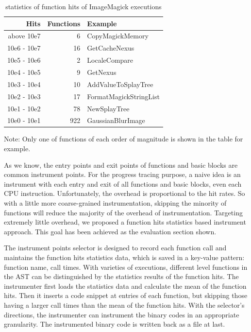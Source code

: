  \begin{table}[h]
\caption{statistics of function hits of ImageMagick executions}
\label{table:inst-stats}
\begin{center}
\begin{tabular}{r|r|l}
\hline
Hits & Functions & Example \\
\hline
above  10e7 & 6 & CopyMagickMemory \\
10e6 - 10e7 & 16 & GetCacheNexus \\
10e5 - 10e6 & 2 & LocaleCompare \\
10e4 - 10e5 & 9 & GetNexus \\
10e3 - 10e4 & 10 & AddValueToSplayTree \\
10e2 - 10e3 & 17 & FormatMagickStringList \\
10e1 - 10e2 & 78 & NewSplayTree \\
10e0 - 10e1 & 922 & GaussianBlurImage \\
\hline
\end{tabular}
\end{center}
Note: Only one of functions of each order of magnitude is shown in the table for example.
\end{table}

As we know, the entry points and exit points of functions and basic blocks are common instrument points. For the progress tracing purpose, a naive idea is an instrument with each entry and exit of all functions and basic blocks, even each CPU instruction. Unfortunately, the overhead is proportional to the hit rates. So with a little more coarse-grained instrumentation, skipping the minority of functions will reduce the majority of the overhead of instrumentation. Targeting extremely little overhead, we proposed a function hits statistics based instrument approach. This goal has been achieved as the evaluation section shown.

The instrument points selector is designed to record each function call and maintains the function hits statistics data, which is saved in a key-value pattern: function name, call times. With varieties of executions, different level functions in the AST can be distinguished by the statistics results of the function hits. The instrumenter first loads the statistics data and calculate the mean of the function hits. Then it inserts a code snippet at entries of each function, but skipping those having a larger call times than the mean of the function hits. With the selector's directions, the instrumenter can instrument the binary codes in an appropriate granularity. The instrumented binary code is written back as a file at last.


